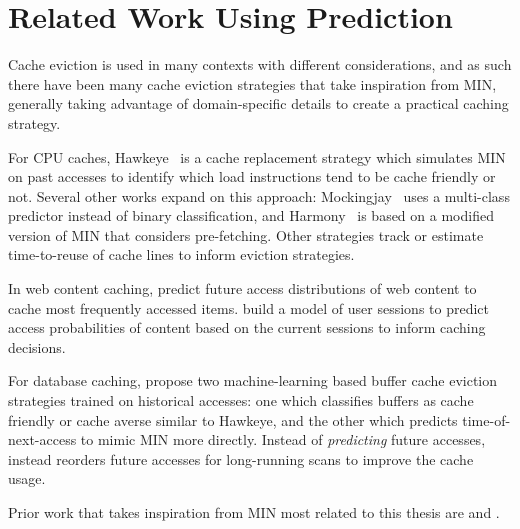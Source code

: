 \section{Related Work Using Prediction}

Cache eviction is used in many contexts with different considerations, and as such there have been many cache eviction strategies that take inspiration from MIN, generally taking advantage of domain-specific details to create a practical caching strategy.

For CPU caches, Hawkeye~\cite{jain2016back} is a cache replacement strategy which simulates MIN on past accesses to identify which load instructions tend to be cache friendly or not. Several other works expand on this approach: Mockingjay~\cite{shah2022effective} uses a multi-class predictor instead of binary classification, and Harmony~\cite{jain2018rethinking} is based on a modified version of MIN that considers pre-fetching. Other strategies track or estimate time-to-reuse of cache lines to inform eviction strategies. \cite{keramidas2007cache, wu2011ship} %

In web content caching, \citet{famaey2013towards} predict future access distributions of web content to cache most frequently accessed items. \citet{yang2003web} build a model of user sessions to predict access probabilities of content based on the current sessions to inform caching decisions.





For database caching, \citet{yuan2022learned} propose two machine-learning based buffer cache eviction strategies trained on historical accesses: one which classifies buffers as cache friendly or cache averse similar to Hawkeye, and the other which predicts time-of-next-access to mimic MIN more directly.
Instead of \textit{predicting} future accesses, \cite{coopScans} instead reorders future accesses for long-running scans to improve the cache usage.

Prior work that takes inspiration from MIN most related to this thesis are \cite{relaxedBelady} and \cite{pbm}. 

